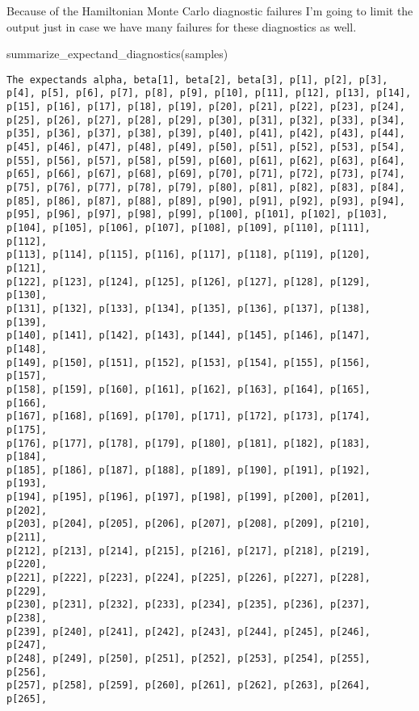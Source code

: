 \documentclass[
  letterpaper,
  DIV=11,
  numbers=noendperiod]{scrartcl}
\newenvironment{Shaded}{\begin{snugshade}}{\end{snugshade}}
\newcommand{\FunctionTok}[1]{\textcolor[rgb]{0.28,0.35,0.67}{#1}}
\newcommand{\NormalTok}[1]{\textcolor[rgb]{0.00,0.23,0.31}{#1}}
\begin{document}
Because of the Hamiltonian Monte Carlo diagnostic failures I'm going to
limit the output just in case we have many failures for these
diagnostics as well.

\begin{Shaded}
\begin{Highlighting}[]
\FunctionTok{summarize\_expectand\_diagnostics}\NormalTok{(samples)}
\end{Highlighting}
\end{Shaded}

\begin{verbatim}
The expectands alpha, beta[1], beta[2], beta[3], p[1], p[2], p[3],
p[4], p[5], p[6], p[7], p[8], p[9], p[10], p[11], p[12], p[13], p[14],
p[15], p[16], p[17], p[18], p[19], p[20], p[21], p[22], p[23], p[24],
p[25], p[26], p[27], p[28], p[29], p[30], p[31], p[32], p[33], p[34],
p[35], p[36], p[37], p[38], p[39], p[40], p[41], p[42], p[43], p[44],
p[45], p[46], p[47], p[48], p[49], p[50], p[51], p[52], p[53], p[54],
p[55], p[56], p[57], p[58], p[59], p[60], p[61], p[62], p[63], p[64],
p[65], p[66], p[67], p[68], p[69], p[70], p[71], p[72], p[73], p[74],
p[75], p[76], p[77], p[78], p[79], p[80], p[81], p[82], p[83], p[84],
p[85], p[86], p[87], p[88], p[89], p[90], p[91], p[92], p[93], p[94],
p[95], p[96], p[97], p[98], p[99], p[100], p[101], p[102], p[103],
p[104], p[105], p[106], p[107], p[108], p[109], p[110], p[111], p[112],
p[113], p[114], p[115], p[116], p[117], p[118], p[119], p[120], p[121],
p[122], p[123], p[124], p[125], p[126], p[127], p[128], p[129], p[130],
p[131], p[132], p[133], p[134], p[135], p[136], p[137], p[138], p[139],
p[140], p[141], p[142], p[143], p[144], p[145], p[146], p[147], p[148],
p[149], p[150], p[151], p[152], p[153], p[154], p[155], p[156], p[157],
p[158], p[159], p[160], p[161], p[162], p[163], p[164], p[165], p[166],
p[167], p[168], p[169], p[170], p[171], p[172], p[173], p[174], p[175],
p[176], p[177], p[178], p[179], p[180], p[181], p[182], p[183], p[184],
p[185], p[186], p[187], p[188], p[189], p[190], p[191], p[192], p[193],
p[194], p[195], p[196], p[197], p[198], p[199], p[200], p[201], p[202],
p[203], p[204], p[205], p[206], p[207], p[208], p[209], p[210], p[211],
p[212], p[213], p[214], p[215], p[216], p[217], p[218], p[219], p[220],
p[221], p[222], p[223], p[224], p[225], p[226], p[227], p[228], p[229],
p[230], p[231], p[232], p[233], p[234], p[235], p[236], p[237], p[238],
p[239], p[240], p[241], p[242], p[243], p[244], p[245], p[246], p[247],
p[248], p[249], p[250], p[251], p[252], p[253], p[254], p[255], p[256],
p[257], p[258], p[259], p[260], p[261], p[262], p[263], p[264], p[265],

\end{verbatim}
\end{document}
